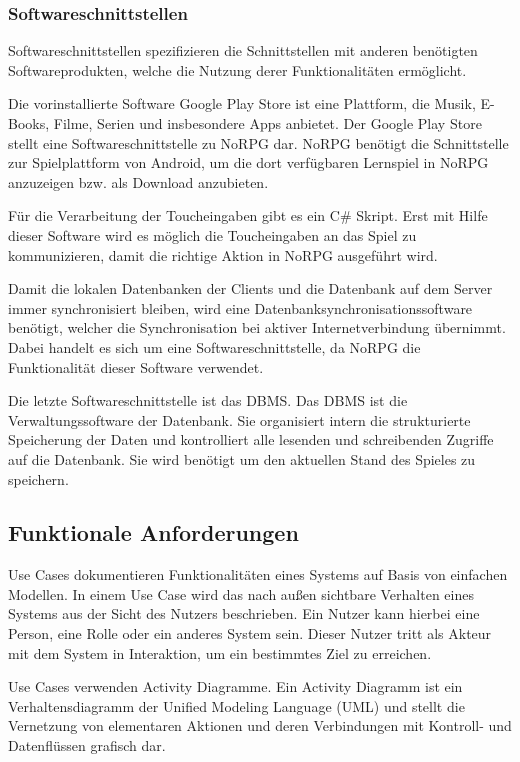 		\subsubsection{Softwareschnittstellen}
			Softwareschnittstellen spezifizieren die Schnittstellen mit anderen benötigten Softwareprodukten, welche die Nutzung derer Funktionalitäten ermöglicht.
			
			Die vorinstallierte Software Google Play Store ist eine Plattform, die Musik, E-Books, Filme, Serien und insbesondere Apps anbietet. Der Google Play Store stellt eine Softwareschnittstelle zu NoRPG dar. NoRPG benötigt die Schnittstelle zur Spielplattform von Android, um die dort verfügbaren Lernspiel in NoRPG anzuzeigen bzw. als Download anzubieten.
			
			Für die Verarbeitung der Toucheingaben gibt es ein C\# Skript. Erst mit Hilfe dieser Software wird es möglich die Toucheingaben an das Spiel zu kommunizieren, damit die richtige Aktion in NoRPG ausgeführt wird.
			
			Damit die lokalen Datenbanken der Clients und die Datenbank auf dem Server immer synchronisiert bleiben, wird eine Datenbanksynchronisationssoftware benötigt, welcher die Synchronisation bei aktiver Internetverbindung übernimmt. Dabei handelt es sich um eine Softwareschnittstelle, da NoRPG die Funktionalität dieser Software verwendet.
			
			Die letzte Softwareschnittstelle ist das \ac{DBMS}. Das \ac{DBMS} ist die Verwaltungssoftware der Datenbank. Sie organisiert intern die strukturierte Speicherung der Daten und kontrolliert alle lesenden und schreibenden Zugriffe auf die Datenbank. Sie wird benötigt um den aktuellen Stand des Spieles zu speichern.

	\subsection{Funktionale Anforderungen}
		Use Cases dokumentieren Funktionalitäten eines Systems auf Basis von einfachen Modellen. In einem Use Case wird das nach außen sichtbare Verhalten eines Systems aus der Sicht des Nutzers beschrieben. Ein Nutzer kann hierbei eine Person, eine Rolle oder ein anderes System sein. Dieser Nutzer tritt als Akteur mit dem System in Interaktion, um ein bestimmtes Ziel zu erreichen.
		
		Use Cases verwenden Activity Diagramme. Ein Activity Diagramm ist ein Verhaltensdiagramm der Unified Modeling Language (UML) und stellt die Vernetzung von elementaren Aktionen und deren Verbindungen mit Kontroll- und Datenflüssen grafisch dar.
	
